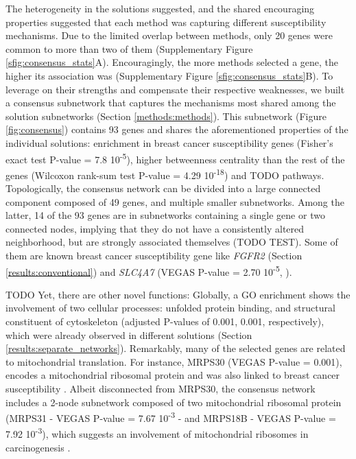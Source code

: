 \documentclass[twocolumn, 11pt, draft]{article}
\begin{document}
The heterogeneity in the solutions suggested, and the shared encouraging properties suggested that each method was capturing different susceptibility mechanisms. Due to the limited overlap between methods, only 20 genes were common to more than two of them (Supplementary Figure \ref{sfig:consensus_stats}A). Encouragingly, the more methods selected a gene, the higher its association was (Supplementary Figure \ref{sfig:consensus_stats}B). To leverage on their strengths and compensate their respective weaknesses, we built a consensus subnetwork that captures the mechanisms most shared among the solution subnetworks (Section \ref{methods:methods}). This subnetwork (Figure \ref{fig:consensus}) contains 93 genes and shares the aforementioned properties of the individual solutions: enrichment in breast cancer susceptibility genes (Fisher's exact test P-value = 7.8 \texttimes{} 10\textsuperscript{-5}), higher betweenness centrality than the rest of the genes (Wilcoxon rank-sum test P-value = 4.29 \texttimes{} 10\textsuperscript{-18}) and TODO pathways. Topologically, the consensus network can be divided into a large connected component composed of 49 genes, and multiple smaller subnetworks. Among the latter, 14 of the 93 genes are in subnetworks containing a single gene or two connected nodes, implying that they do not have a consistently altered neighborhood, but are strongly associated themselves (TODO TEST). Some of them are known breast cancer susceptibility gene like \emph{FGFR2} (Section \ref{results:conventional}) and \emph{SLC4A7} (VEGAS P-value = 2.70 \texttimes{} 10\textsuperscript{-5}, \citet{ahmed_newly_2009}).

TODO Yet, there are other novel functions: Globally, a GO enrichment shows the involvement of two cellular processes: unfolded protein binding, and structural constituent of cytoskeleton (adjusted P-values of 0.001, 0.001, respectively), which were already observed in different solutions (Section \ref{results:separate_networks}). Remarkably, many of the selected genes are related to mitochondrial translation. For instance, MRPS30 (VEGAS P-value = 0.001), encodes a mitochondrial ribosomal protein and was also linked to breast cancer susceptibility \cite{quigley_5p12_2014}. Albeit disconnected from MRPS30, the consensus network includes a 2-node subnetwork composed of two mitochondrial ribosomal protein (MRPS31 - VEGAS P-value = 7.67 \texttimes{} 10\textsuperscript{-3} - and MRPS18B - VEGAS P-value = 7.92 \texttimes{} 10\textsuperscript{-3}), which suggests an involvement of mitochondrial ribosomes in carcinogenesis \cite{required}.
\end{document}
